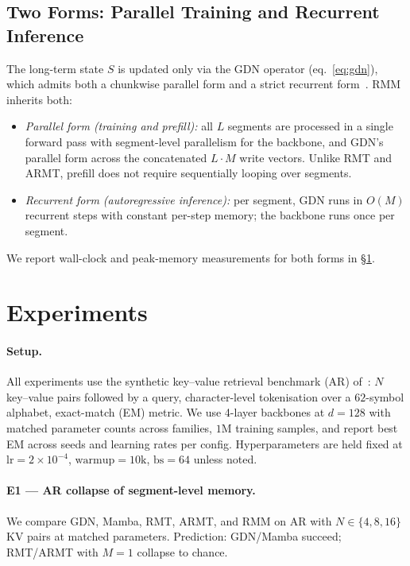\documentclass[11pt]{article}
\begin{document}
\subsection{Two Forms: Parallel Training and Recurrent Inference}
\label{sec:two-forms}

The long-term state $S$ is updated only via the GDN operator (eq.~\ref{eq:gdn}), which admits both a chunkwise parallel form and a strict recurrent form~\citep{yang2024gateddeltanet}. RMM inherits both:
\begin{itemize}
    \item \emph{Parallel form (training and prefill):} all $L$ segments are processed in a single forward pass with segment-level parallelism for the backbone, and GDN's parallel form across the concatenated $L \cdot M$ write vectors. Unlike RMT and ARMT, prefill does not require sequentially looping over segments.
    \item \emph{Recurrent form (autoregressive inference):} per segment, GDN runs in $O(M)$ recurrent steps with constant per-step memory; the backbone runs once per segment.
\end{itemize}
We report wall-clock and peak-memory measurements for both forms in \S\ref{sec:experiments}.


\section{Experiments}
\label{sec:experiments}

\paragraph{Setup.} All experiments use the synthetic key--value retrieval benchmark (AR) of~\citet{arora2023zoology}: $N$ key--value pairs followed by a query, character-level tokenisation over a $62$-symbol alphabet, exact-match (EM) metric. We use 4-layer backbones at $d{=}128$ with matched parameter counts across families, $1$M training samples, and report best EM across seeds and learning rates per config. Hyperparameters are held fixed at $\mathrm{lr}{=}2\!\times\!10^{-4}$, $\mathrm{warmup}{=}10\mathrm{k}$, $\mathrm{bs}{=}64$ unless noted.

\paragraph{E1 — AR collapse of segment-level memory.}
We compare GDN, Mamba, RMT, ARMT, and RMM on AR with $N \in \{4, 8, 16\}$ KV pairs at matched parameters. Prediction: GDN/Mamba succeed; RMT/ARMT with $M{=}1$ collapse to chance.
\end{document}
